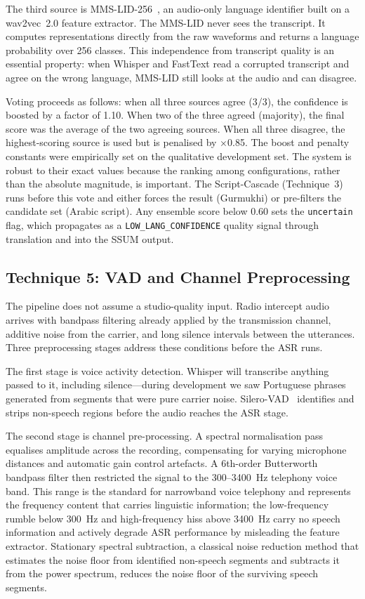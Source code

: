 \documentclass[12pt, onecolumn]{IEEEtran}
\begin{document}
The third source is MMS-LID-256~\cite{pratap2023scaling}, an audio-only language identifier built on a wav2vec~2.0 feature extractor. The MMS-LID never sees the transcript. It computes representations directly from the raw waveforms and returns a language probability over 256 classes. This independence from transcript quality is an essential property: when Whisper and FastText read a corrupted transcript and agree on the wrong language, MMS-LID still looks at the audio and can disagree.

Voting proceeds as follows: when all three sources agree (3/3), the confidence is boosted by a factor of 1.10. When two of the three agreed (majority), the final score was the average of the two agreeing sources. When all three disagree, the highest-scoring source is used but is penalised by $\times$0.85. The boost and penalty constants were empirically set on the qualitative development set. The system is robust to their exact values because the ranking among configurations, rather than the absolute magnitude, is important. The Script-Cascade (Technique~3) runs before this vote and either forces the result (Gurmukhi) or pre-filters the candidate set (Arabic script). Any ensemble score below 0.60 sets the \texttt{uncertain} flag, which propagates as a \texttt{LOW\_LANG\_CONFIDENCE} quality signal through translation and into the SSUM output.

\subsection{Technique 5: VAD and Channel Preprocessing}

The pipeline does not assume a studio-quality input. Radio intercept audio arrives with bandpass filtering already applied by the transmission channel, additive noise from the carrier, and long silence intervals between the utterances. Three preprocessing stages address these conditions before the ASR runs.

The first stage is voice activity detection. Whisper will transcribe anything passed to it, including silence---during development we saw Portuguese phrases generated from segments that were pure carrier noise. Silero-VAD~\cite{silero2021vad} identifies and strips non-speech regions before the audio reaches the ASR stage.

The second stage is channel pre-processing. A spectral normalisation pass equalises amplitude across the recording, compensating for varying microphone distances and automatic gain control artefacts. A 6th-order Butterworth bandpass filter then restricted the signal to the 300--3400~Hz telephony voice band. This range is the standard for narrowband voice telephony and represents the frequency content that carries linguistic information; the low-frequency rumble below 300~Hz and high-frequency hiss above 3400~Hz carry no speech information and actively degrade ASR performance by misleading the feature extractor. Stationary spectral subtraction, a classical noise reduction method that estimates the noise floor from identified non-speech segments and subtracts it from the power spectrum, reduces the noise floor of the surviving speech segments.
\end{document}

